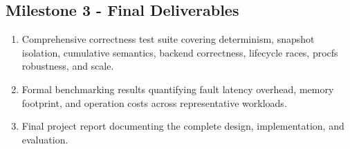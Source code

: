 \subsection*{Milestone 3 - Final Deliverables}
    \begin{enumerate}
        \item Comprehensive correctness test suite covering determinism, snapshot isolation, cumulative
              semantics, backend correctness, lifecycle races, procfs robustness, and scale.
        \item Formal benchmarking results quantifying fault latency overhead, memory footprint,
              and operation costs across representative workloads.
        \item Final project report documenting the complete design, implementation, and evaluation.
    \end{enumerate}

